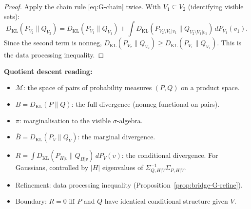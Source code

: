 \documentclass[11pt,a4paper]{article}
\numberwithin{equation}{section}
\theoremstyle{thmcompact}
\theoremstyle{remark}
\begin{document}
\begin{proof}
Apply the chain rule \eqref{eq:G-chain} twice. With $V_1 \subseteq V_2$ (identifying visible sets):
\[
D_{\mathrm{KL}}(P_{V_2} \| Q_{V_2}) = D_{\mathrm{KL}}(P_{V_1} \| Q_{V_1}) + \int D_{\mathrm{KL}}(P_{V_2 \setminus V_1 | v_1} \| Q_{V_2 \setminus V_1 | v_1})\, dP_{V_1}(v_1).
\]
Since the second term is nonneg, $D_{\mathrm{KL}}(P_{V_2} \| Q_{V_2}) \geq D_{\mathrm{KL}}(P_{V_1} \| Q_{V_1})$. This is the data processing inequality.
\end{proof}

\textbf{Quotient descent reading:}
\begin{itemize}[leftmargin=2em]
\item $\mathcal{M}$: the space of pairs of probability measures $(P, Q)$ on a product space.
\item $B = D_{\mathrm{KL}}(P \| Q)$: the full divergence (nonneg functional on pairs).
\item $\pi$: marginalisation to the visible $\sigma$-algebra.
\item $\bar{B} = D_{\mathrm{KL}}(P_V \| Q_V)$: the marginal divergence.
\item $R = \int D_{\mathrm{KL}}(P_{H|v} \| Q_{H|v})\, dP_V(v)$: the conditional divergence. For Gaussians, controlled by $|H|$ eigenvalues of $\Sigma_{Q,H|V}^{-1}\Sigma_{P,H|V}$.
\item Refinement: data processing inequality (Proposition~\ref{prop:bridge-G-refine}).
\item Boundary: $R = 0$ iff $P$ and $Q$ have identical conditional structure given $V$.
\end{itemize}
\end{document}
